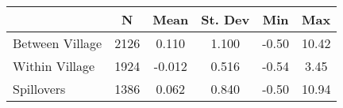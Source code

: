\begin{tabular}{l*{5}{c}}\hline&\multicolumn{1}{c}{N}&\multicolumn{1}{c}{Mean}&\multicolumn{1}{c}{St. Dev}&\multicolumn{1}{c}{Min}&\multicolumn{1}{c}{Max}\\ \hline 
Between Village & 2126 & 0.110 & 1.100 & -0.50 & 10.42 \\
Within Village & 1924 & -0.012 & 0.516 & -0.54 & 3.45 \\
Spillovers & 1386 & 0.062 & 0.840 & -0.50 & 10.94 \\
\hline \end{tabular}
